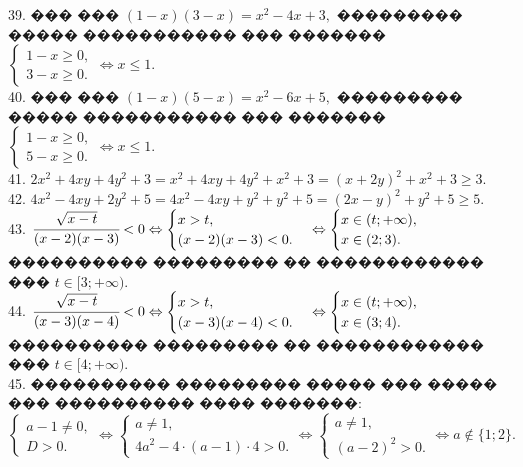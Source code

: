 \documentclass[12pt]{article}
\begin{document}
39. ��� ��� $(1-x)(3-x)=x^2-4x+3,$ ��������� ����� ����������� ��� ������� $\begin{cases}1-x\geqslant0,\\ 3-x\geqslant0.\end{cases}\Leftrightarrow x\leqslant1.$\\
40. ��� ��� $(1-x)(5-x)=x^2-6x+5,$ ��������� ����� ����������� ��� ������� $\begin{cases}1-x\geqslant0,\\ 5-x\geqslant0.\end{cases}\Leftrightarrow x\leqslant1.$\\
41. $2x^2+4xy+4y^2+3=x^2+4xy+4y^2+x^2+3=(x+2y)^2+x^2+3\geqslant3.$\\
42. $4x^2-4xy+2y^2+5=4x^2-4xy+y^2+y^2+5=(2x-y)^2+y^2+5\geqslant5.$\\
43. $\cfrac{\sqrt{x-t}}{(x-2)(x-3)}<0\Leftrightarrow \begin{cases}x>t,\\(x-2)(x-3)<0.\end{cases}
\Leftrightarrow \begin{cases}x\in(t;+\infty),\\ x\in(2;3).\end{cases}$ ���������� ��������� �� ������������ ��� $t\in[3;+\infty).$\\
44. $\cfrac{\sqrt{x-t}}{(x-3)(x-4)}<0\Leftrightarrow \begin{cases}x>t,\\(x-3)(x-4)<0.\end{cases}
\Leftrightarrow \begin{cases}x\in(t;+\infty),\\ x\in(3;4).\end{cases}$ ���������� ��������� �� ������������ ��� $t\in[4;+\infty).$\\
45. ���������� ��������� ����� ��� ����� ��� ���������� ���� �������:\\ $\begin{cases}a-1\neq0,\\ D>0.\end{cases}\Leftrightarrow
\begin{cases}a\neq1,\\ 4a^2-4\cdot(a-1)\cdot4>0.\end{cases}\Leftrightarrow
\begin{cases}a\neq1,\\ (a-2)^2>0.\end{cases}\Leftrightarrow a\notin\{1;2\}.$\\
\end{document}
